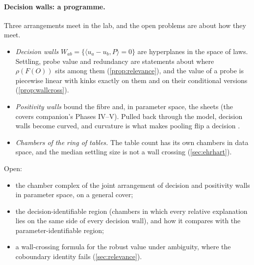 \documentclass[11pt]{article}
\theoremstyle{definition}\newtheorem{definition}{Definition}\newtheorem{remark}{Remark}
\begin{document}
\paragraph{Decision walls: a programme.} Three arrangements meet in the lab, and the open problems are about how they meet.
\begin{itemize}
\item \emph{Decision walls} $W_{ab}=\{\langle u_a-u_b,P\rangle=0\}$ are hyperplanes in the space of laws. Settling, probe value and
  redundancy are statements about where $\rho(F(O))$ sits among them (\cref{prop:relevance}), and the value of a probe is piecewise
  linear with kinks exactly on them and on their conditional versions (\cref{prop:wallcross}).
\item \emph{Positivity walls} bound the fibre and, in parameter space, the sheets (the covers companion's Phases IV--V). Pulled back
  through the model, decision walls become curved, and curvature is what makes pooling flip a decision \cite{TangentCompanion}.
\item \emph{Chambers of the ring of tables.} The table count has its own chambers in data space, and the median settling size is not a
  wall crossing (\cref{sec:ehrhart}).
\end{itemize}
Open:
\begin{itemize}
\item the chamber complex of the joint arrangement of decision and positivity walls in parameter space, on a general cover;
\item the decision-identifiable region (chambers in which every relative explanation lies on the same side of every decision wall), and
  how it compares with the parameter-identifiable region;
\item a wall-crossing formula for the robust value under ambiguity, where the coboundary identity fails (\cref{sec:relevance}).
\end{itemize}
\end{document}
